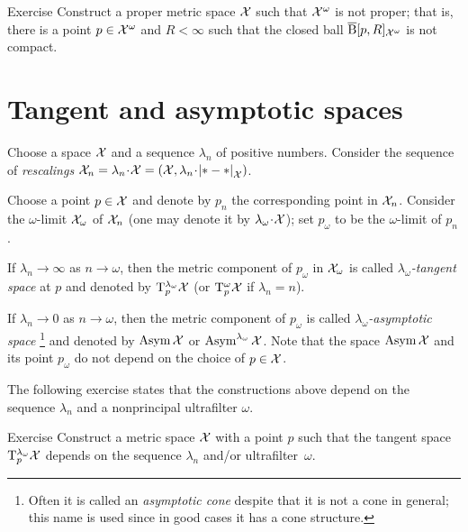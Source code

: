 \begin{thm}{Exercise}\label{ex:notproper-limit}
Construct a proper metric space $\mathcal{X}$ such that $\mathcal{X}^\omega$ is not proper;
that is, there is a point $p\in \mathcal{X}^\omega$ and $R<\infty$ such that the closed ball $\overline{\mathrm{B}}{}[p,R]_{\mathcal{X}^\omega}$ is not compact.
\end{thm}

\section{Tangent and asymptotic spaces}
\label{sec:tan+asymptotic}

Choose a space $\mathcal{X}$ and a sequence $\lambda_n$ of positive numbers.
Consider the sequence of \emph{rescalings} $\spc{X}_n=\lambda_n\cdot\spc{X}=(\spc{X},\lambda_n\cdot\dist{*}{*}{\spc{X}})$.

Choose a point $p\in \mathcal{X}$ and denote by $p_n$ the corresponding point in $\mathcal{X}_n$.
Consider the $\omega$-limit $\mathcal{X}_\omega$ of $\mathcal{X}_n$ (one may denote it by $\lambda_\omega\cdot \spc{X}$);
set $p_\omega$ to be the $\omega$-limit of $p_n$.

If $\lambda_n\to \infty$ as $n\to\omega$, then the metric component of $p_\omega$ in $\mathcal{X}_\omega$ is called \emph{$\lambda_\omega$-tangent space} at $p$ and denoted by $\mathrm{T}_p^{\lambda_\omega}\mathcal{X}$ (or $\mathrm{T}_p^{\omega}\mathcal{X}$ if $\lambda_n=n$).\label{page:ultratangent space}

If $\lambda_n\to 0$ as $n\to\omega$, then the metric component of $p_\omega$ is called \emph{$\lambda_\omega$-asymptotic space}%
\footnote{Often it is called an {}\emph{asymptotic cone} despite that it is not a cone in general; this name is used since in good cases it has a cone structure.} and denoted by $\mathop{\rm Asym}\nolimits\mathcal{X}$ or $\mathop{\rm Asym}\nolimits^{\lambda_\omega}\mathcal{X}$.
Note that the space $\mathop{\rm Asym}\nolimits\mathcal{X}$ and its point $p_\omega$ do not depend on the choice of $p\in \mathcal{X}$.

The following exercise states that the constructions above depend on the sequence $\lambda_n$ and a nonprincipal ultrafilter $\omega$.

\begin{thm}{Exercise}\label{ex:ultraT}
Construct a metric space $\mathcal{X}$ with a point $p$ such that the tangent space
$\mathrm{T}_p^{\lambda_\omega}\mathcal{X}$ depends on the sequence $\lambda_n$ and/or ultrafilter~$\omega$.
\end{thm}


